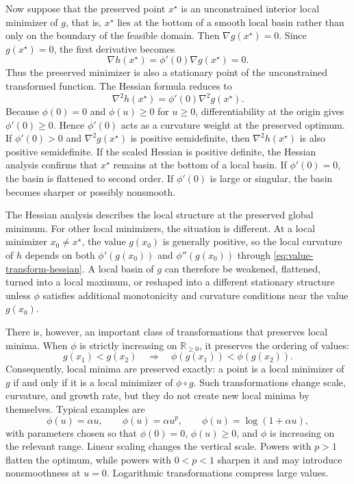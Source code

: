 \documentclass[11pt,a4paper]{article}
\theoremstyle{remark}
\theoremstyle{plain}
\begin{document}
Now suppose that the preserved point \(x^\star\) is an unconstrained interior
local minimizer of \(g\), that is, \(x^\star\) lies at the bottom of a smooth
local basin rather than only on the boundary of the feasible domain. Then
\(\nabla g(x^\star)=0\). Since \(g(x^\star)=0\), the first derivative becomes
\[
	\nabla h(x^\star)
	=
	\phi'(0)\nabla g(x^\star)
	=
	0.
\]
Thus the preserved minimizer is also a stationary point of the unconstrained
transformed function. The Hessian formula reduces to
\begin{equation}
	\nabla^2 h(x^\star)
	=
	\phi'(0)\nabla^2 g(x^\star).
	\label{eq:value-transform-hessian-minimizer}
\end{equation}
Because \(\phi(0)=0\) and \(\phi(u)\ge0\) for \(u\ge0\), differentiability at
the origin gives \(\phi'(0)\ge0\). Hence \(\phi'(0)\) acts as a curvature
weight at the preserved optimum. If \(\phi'(0)>0\) and
\(\nabla^2 g(x^\star)\) is positive semidefinite, then
\(\nabla^2 h(x^\star)\) is also positive semidefinite. If the scaled Hessian is
positive definite, the Hessian analysis confirms that \(x^\star\) remains at
the bottom of a local basin. If \(\phi'(0)=0\), the basin is flattened to
second order. If \(\phi'(0)\) is large or singular, the basin becomes sharper
or possibly nonsmooth.


The Hessian analysis describes the local structure at the preserved global
minimum. For other local minimizers, the situation is different. At a local
minimizer \(x_0\ne x^\star\), the value \(g(x_0)\) is generally positive, so
the local curvature of \(h\) depends on both \(\phi'(g(x_0))\) and
\(\phi''(g(x_0))\) through \eqref{eq:value-transform-hessian}. A local basin of
\(g\) can therefore be weakened, flattened, turned into a local maximum, or
reshaped into a different stationary structure unless \(\phi\) satisfies
additional monotonicity and curvature conditions near the value \(g(x_0)\).

There is, however, an important class of transformations that preserves local
minima. When \(\phi\) is strictly increasing on \(\mathbb{R}_{\ge0}\), it preserves the
ordering of values:
\[
	g(x_1)<g(x_2)
	\quad\Longrightarrow\quad
	\phi(g(x_1))<\phi(g(x_2)).
\]
Consequently, local minima are preserved exactly: a point is a local minimizer
of \(g\) if and only if it is a local minimizer of \(\phi\circ g\). Such
transformations change scale, curvature, and growth rate, but they do not create
new local minima by themselves. Typical examples are
\[
	\phi(u)=\alpha u,
	\qquad
	\phi(u)=\alpha u^p,
	\qquad
	\phi(u)=\log(1+\alpha u),
\]
with parameters chosen so that \(\phi(0)=0\), \(\phi(u)\ge0\), and \(\phi\) is
increasing on the relevant range. Linear scaling changes the vertical scale.
Powers with \(p>1\) flatten the optimum, while powers with \(0<p<1\) sharpen it
and may introduce nonsmoothness at \(u=0\). Logarithmic transformations compress
large values. 
\end{document}
